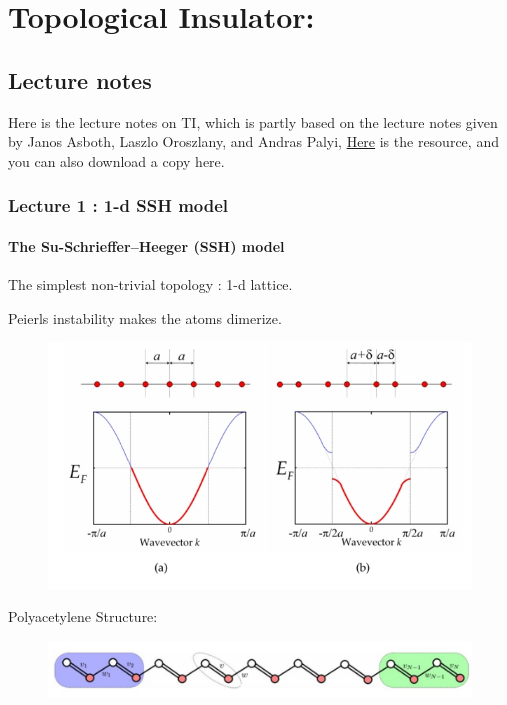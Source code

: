 \documentclass[letterpaper,10pt,english]{sphinxmanual}
\begin{document}
\chapter{Topological Insulator:}
\label{index:topological-insulator}

\section{Lecture notes}
\label{TI/Lecture notes/main:lecture-notes}\label{TI/Lecture notes/main::doc}\label{TI/Lecture notes/main:id1}
Here is the lecture notes on TI, which is partly based on the lecture notes given by Janos Asboth, Laszlo Oroszlany, and Andras Palyi, \href{http://fizipedia.bme.hu/images/1/14/Topological\_insulators.pdf}{Here} is the resource, and you can also download a copy here.


\subsection{Lecture 1 : 1-d SSH model}
\label{TI/Lecture notes/1::doc}\label{TI/Lecture notes/1:lecture-1-1-d-ssh-model}

\subsubsection{The Su-Schrieffer--Heeger (SSH) model}
\label{TI/Lecture notes/1:the-su-schrieffer-heeger-ssh-model}
The simplest non-trivial topology : 1-d lattice.

Peierls instability makes the atoms dimerize.
\begin{figure}[htbp]
\centering

\includegraphics[width=0.700\linewidth]{1.png}
\end{figure}

Polyacetylene Structure:
\begin{figure}[htbp]
\centering

\includegraphics[width=0.700\linewidth]{2.jpg}
\end{figure}
\end{document}
